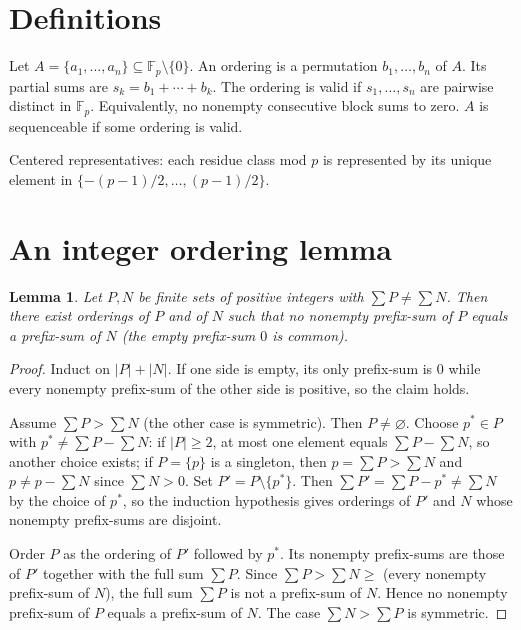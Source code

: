 \documentclass[11pt]{article}
\newtheorem{lemma}[theorem]{Lemma}
\theoremstyle{definition}
\begin{document}
\section{Definitions}

Let $A=\{a_1,\dots,a_n\}\subseteq\mathbb F_p\setminus\{0\}$. An ordering is
a permutation $b_1,\dots,b_n$ of $A$. Its partial sums are
$s_k=b_1+\cdots+b_k$. The ordering is valid if $s_1,\dots,s_n$ are pairwise
distinct in $\mathbb F_p$. Equivalently, no nonempty consecutive block sums
to zero. $A$ is sequenceable if some ordering is valid.

Centered representatives: each residue class mod $p$ is represented by its
unique element in $\{-(p-1)/2,\dots,(p-1)/2\}$.

\section{An integer ordering lemma}

\begin{lemma}\label{lem:ordering}
Let $P,N$ be finite sets of positive integers with $\sum P\ne\sum N$. Then
there exist orderings of $P$ and of $N$ such that no nonempty prefix-sum of
$P$ equals a prefix-sum of $N$ (the empty prefix-sum $0$ is common).
\end{lemma}

\begin{proof}
Induct on $|P|+|N|$. If one side is empty, its only prefix-sum is $0$ while
every nonempty prefix-sum of the other side is positive, so the claim holds.

Assume $\sum P>\sum N$ (the other case is symmetric). Then $P\ne\varnothing$.
Choose $p^*\in P$ with $p^*\ne\sum P-\sum N$: if $|P|\ge2$, at most one
element equals $\sum P-\sum N$, so another choice exists; if $P=\{p\}$ is a
singleton, then $p=\sum P>\sum N$ and $p\ne p-\sum N$ since $\sum N>0$.
Set $P'=P\setminus\{p^*\}$. Then $\sum P'=\sum P-p^*\ne\sum N$ by the
choice of $p^*$, so the induction hypothesis gives orderings of $P'$ and $N$
whose nonempty prefix-sums are disjoint.

Order $P$ as the ordering of $P'$ followed by $p^*$. Its nonempty prefix-sums
are those of $P'$ together with the full sum $\sum P$. Since
$\sum P>\sum N\ge$ (every nonempty prefix-sum of $N$), the full sum $\sum P$
is not a prefix-sum of $N$. Hence no nonempty prefix-sum of $P$ equals a
prefix-sum of $N$. The case $\sum N>\sum P$ is symmetric.
\end{proof}
\end{document}
